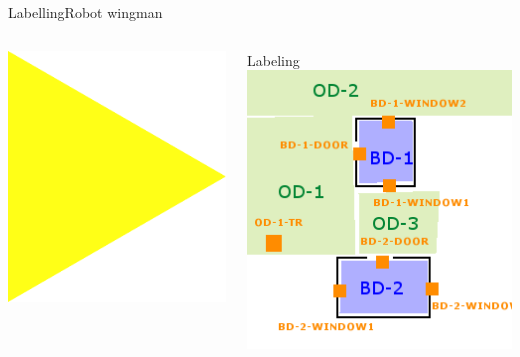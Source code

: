 \begin{frame}{Labelling}{Robot wingman}
\begin{columns}
\begin{minipage}{\textwidth}
\centering
\includegraphics[width = \textwidth]{./figure/arrow2}
\end{minipage}

\begin{minipage}{\textwidth}
\begin{block}{Labeling}
\centering
\includegraphics[width = \textwidth]{./figure/simulation/label.png}
\end{block}
\end{minipage}


\end{columns}
\end{frame}

